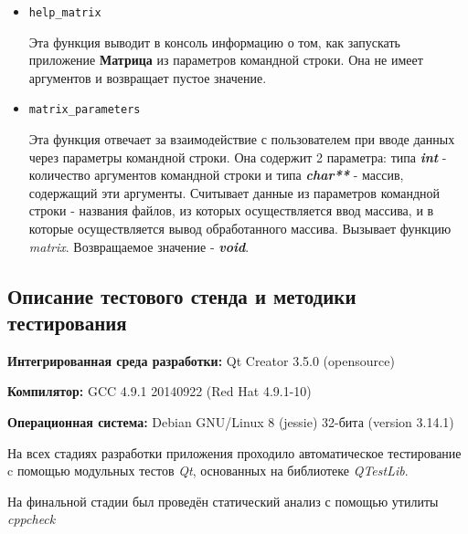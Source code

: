 \documentclass[12pt,a4paper]{report}
\begin{document}
\begin{enumerate}
\begin{itemize}
\item \verb-help_matrix-

Эта функция выводит в консоль информацию о том, как запускать приложение \textbf{Матрица} из параметров командной строки. Она не имеет аргументов и возвращает пустое значение. 
\end{itemize}

\begin{itemize}
\item \verb-matrix_parameters-

Эта функция отвечает за взаимодействие с пользователем при вводе данных через параметры командной строки. Она содержит 2 параметра: типа \textbf{\textit{int}} - количество аргументов командной строки и типа \textbf{\textit{char**}} - массив, содержащий эти аргументы. Считывает данные из параметров командной строки - названия файлов, из которых осуществляется ввод массива, и в которые осуществляется вывод обработанного массива. Вызывает функцию \textit{matrix}. Возвращаемое значение - \textit{\textbf{void}}.
\end{itemize}
\end{enumerate}
\subsection{Описание тестового стенда и методики тестирования}

\begin{flushleft}
\textbf{Интегрированная среда разработки:} Qt Creator 3.5.0 (opensource)

\textbf{Компилятор:} GCC 4.9.1 20140922 (Red Hat 4.9.1-10)

\textbf{Операционная система:} Debian GNU/Linux 8 (jessie) 32-бита (version 3.14.1)
\end{flushleft}

На всех стадиях разработки приложения проходило автоматическое тестирование c помощью модульных тестов \textit{Qt}, основанных на библиотеке  \textit{QTestLib}.

На финальной стадии был проведён статический анализ с помощью утилиты \textit{cppcheck}%
\end{document}
